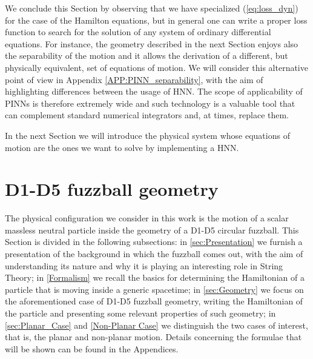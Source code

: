\documentclass[prd,aps,a4paper,eqsecnum,nofootinbib,floatfix,twocolumn,superscriptaddress]{revtex4-2}
\begin{document}
We conclude this Section by observing that we have specialized (\ref{eq:loss_dyn}) for the case of the Hamilton equations, but in general one can write a proper loss function to search for the solution of any system of ordinary differential equations. For instance, the geometry described in the next Section enjoys also the separability of the motion and it allows the derivation of a different, but physically equivalent, set of equations of motion. We will consider this alternative point of view in Appendix \ref{APP:PINN_separability}, with the aim of highlighting differences between the usage of HNN.
The scope of applicability of PINNs is therefore extremely wide and such technology is a valuable tool that can complement standard numerical integrators and, at times, replace them.

In the next Section we will introduce the physical system whose equations of motion are the ones we want to solve by implementing a HNN.


\section{\label{sec:fuzzball}D1-D5 fuzzball geometry}
The physical configuration we consider in this work is the motion of a scalar massless neutral particle inside the geometry of a D1-D5 circular fuzzball. This Section is divided in the following subsections: in \ref{sec:Presentation} we furnish a presentation of the background in which the fuzzball comes out, with the aim of understanding its nature and why it is playing an interesting role in String Theory; in \ref{Formalism} we recall the basics for determining the  Hamiltonian of a particle that is moving inside a generic spacetime; in \ref{sec:Geometry} we focus on the aforementioned case of D1-D5 fuzzball geometry, writing the  Hamiltonian of the particle and presenting some relevant properties of such geometry; in \ref{sec:Planar_Case} and \ref{Non-Planar Case} we distinguish the two cases of interest, that is, the planar and non-planar motion. Details concerning the formulae that will be shown can be found in the Appendices.
\end{document}
